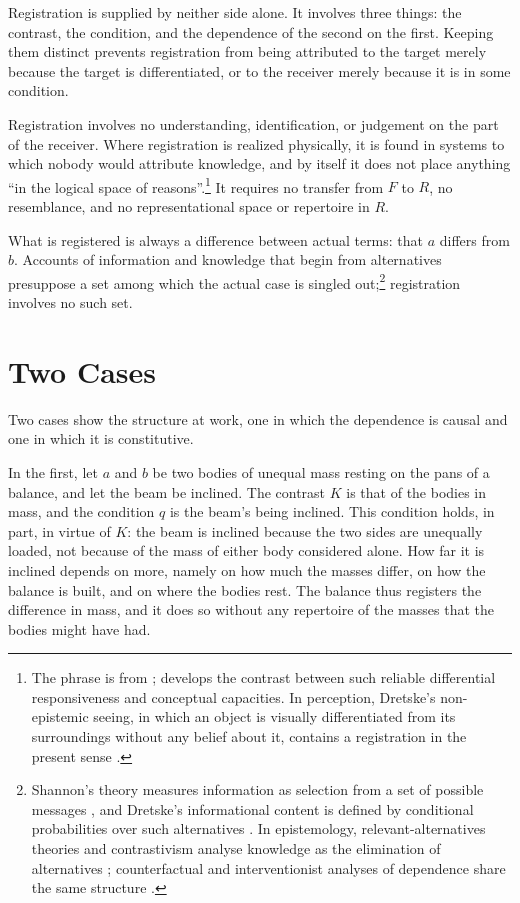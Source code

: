 \documentclass[11pt,a4paper,oneside]{scrartcl}
\newcommand{\F}{\ensuremath{F}}
\newcommand{\R}{\ensuremath{R}}
\begin{document}
Registration is supplied by neither side alone. It involves three things: the contrast, the
condition, and the dependence of the second on the first. Keeping them distinct prevents registration from
being attributed to the target merely because the target is differentiated, or to the receiver
merely because it is in some condition.

Registration involves no understanding, identification, or judgement on the part of the receiver. Where
registration is realized physically, it is found in systems to which nobody would attribute
knowledge, and by itself it does not place anything \enquote{in the logical space of
reasons}.\footnote{The phrase is from \textcite[§\,36]{sellars1956}; \textcite[ch.~4]{brandom1994}
develops the contrast between such reliable differential responsiveness and conceptual capacities.
In perception, Dretske's non-epistemic seeing, in which an object is visually differentiated from
its surroundings without any belief about it, contains a registration in the present sense
\autocite{dretske1969}.} It requires no transfer from \F{} to \R, no resemblance, and no
representational space or repertoire in \R.

What is registered is always a difference between actual terms: that $a$ differs from $b$. Accounts
of information and knowledge that begin from alternatives presuppose a set among which the actual
case is singled out;\footnote{Shannon's theory measures information as selection from a set of
possible messages \autocite{shannon1948}, and Dretske's informational content is defined by
conditional probabilities over such alternatives \autocite{dretske1981}. In epistemology,
relevant-alternatives theories and contrastivism analyse knowledge as the elimination of
alternatives \autocite{dretske1970,lewis1996,schaffer2004}; counterfactual and interventionist
analyses of dependence share the same structure \autocite{lewis1973,woodward2003}.} registration involves no
such set.

\section{Two Cases}\label{sec:real}

Two cases show the structure at work, one in which the dependence is causal and one in which it is
constitutive.

In the first, let $a$ and $b$ be two bodies of unequal mass resting on the pans of a balance, and
let the beam be inclined. The contrast $K$ is that of the bodies in mass, and the condition $q$ is
the beam's being inclined. This condition holds, in part, in virtue of $K$: the beam is
inclined because the two sides are unequally loaded, not because of the mass of either body
considered alone. How far it is inclined depends on more, namely on how much the masses differ, on
how the balance is built, and on where the bodies rest. The balance thus registers the difference
in mass, and it does so without any repertoire of the masses that the bodies might have had.
\end{document}
